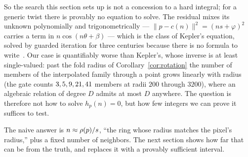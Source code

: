 So the search this section sets up is not a concession to a hard integral;
for a generic twist there is provably no equation to solve. The residual
mixes its unknown polynomially and trigonometrically ---
$\lVert p-c(n)\rVert^2=(ns+\varphi)^2$ carries a term in
$n\cos(n\theta+\beta)$ --- which is the class of Kepler's equation, solved by
guarded iteration for three centuries because there is no formula to
write~\cite{Colwell1993Kepler}. Our case is quantifiably worse than Kepler's,
whose inverse is at least single-valued: past the fold radius of
Corollary~\ref{cor:rotation} the number of members of the interpolated family
through a point grows linearly with radius (the gate counts
$3, 5, 9, 21, 41$ members at radii $200$ through $3200$), where an
algebraic relation of degree $D$ admits at most $D$ anywhere. The question is
therefore not how to solve $h_p(n)=0$, but how few integers we can prove it
suffices to test.

The naive answer is $n \approx \rho(p)/s$, ``the ring whose radius matches the
pixel's radius,'' plus a fixed number of neighbors. The next section shows how
far that can be from the truth, and replaces it with a provably sufficient
interval.

